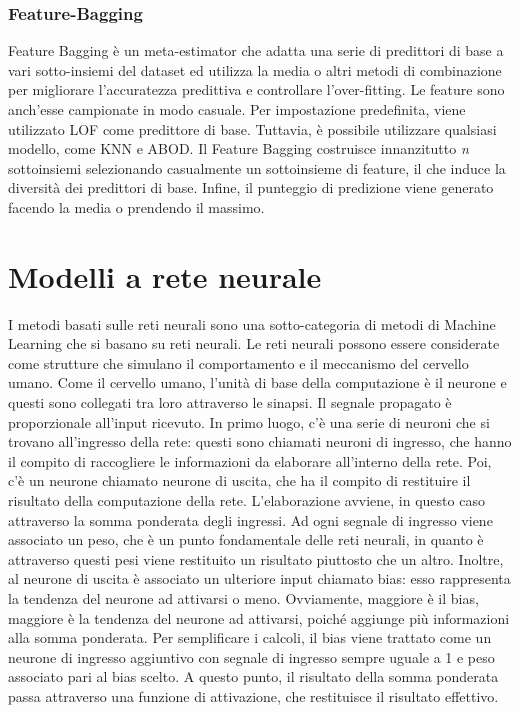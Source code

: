 \subsubsection{Feature-Bagging}
Feature Bagging \cite{lazarevic2005feature} è un meta-estimator che adatta una serie di predittori di base a vari sotto-insiemi del dataset ed utilizza la media o altri metodi di combinazione per migliorare l'accuratezza predittiva e controllare l'over-fitting.
Le feature sono anch'esse campionate in modo casuale.
Per impostazione predefinita, viene utilizzato LOF come predittore di base. Tuttavia, è possibile utilizzare qualsiasi modello, come KNN e ABOD.
Il Feature Bagging costruisce innanzitutto \textit{n} sottoinsiemi selezionando casualmente un sottoinsieme di feature, il che induce la diversità dei predittori di base.
Infine, il punteggio di predizione viene generato facendo la media o prendendo il massimo.

\section{Modelli a rete neurale}
I metodi basati sulle reti neurali sono una sotto-categoria di metodi di Machine Learning che si basano su reti neurali.
Le reti neurali possono essere considerate come strutture che simulano il comportamento e il meccanismo del cervello umano. Come il cervello umano, l'unità di base della computazione è il neurone e questi sono collegati tra loro attraverso le sinapsi.  Il segnale propagato è proporzionale all'input ricevuto.
In primo luogo, c'è una serie di neuroni che si trovano all'ingresso della rete: questi sono chiamati neuroni di ingresso, che hanno il compito di raccogliere le informazioni da elaborare all'interno della rete.
Poi, c'è un neurone chiamato neurone di uscita, che ha il compito di restituire il risultato della computazione della rete. L'elaborazione avviene, in questo caso attraverso la somma ponderata degli ingressi. 
Ad ogni segnale di ingresso viene associato un peso, che è un punto fondamentale delle reti neurali, in quanto è attraverso questi pesi viene restituito un risultato piuttosto che un altro. Inoltre, al neurone di uscita è associato un ulteriore input chiamato bias: esso rappresenta la tendenza del neurone ad attivarsi o meno. Ovviamente, maggiore è il bias, maggiore è la tendenza del neurone ad attivarsi, poiché aggiunge più informazioni alla somma ponderata. Per semplificare i calcoli, il bias viene trattato come un neurone di ingresso aggiuntivo con segnale di ingresso sempre uguale a 1 e peso associato pari al bias scelto. A questo punto, il risultato della somma ponderata passa attraverso una funzione di attivazione, che restituisce il risultato effettivo.

